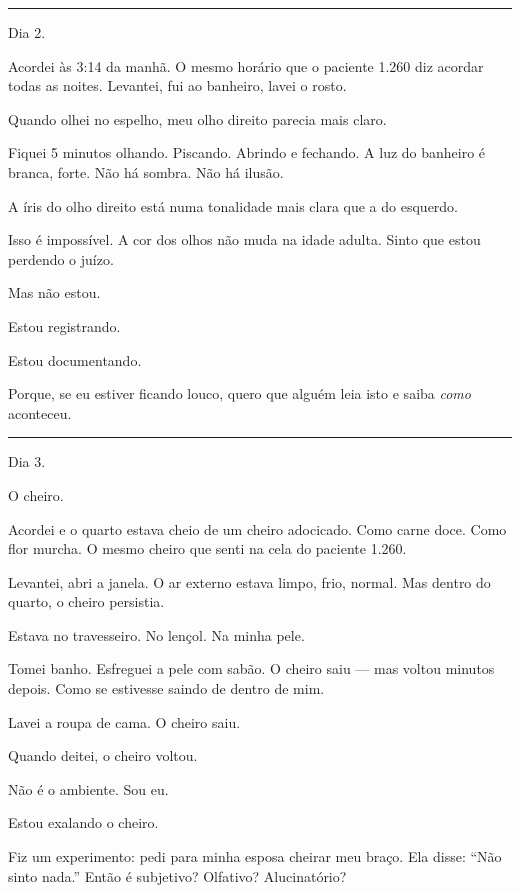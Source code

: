 \vspace{0.5em}\noindent\rule{\textwidth}{0.5pt}\vspace{0.5em}

\noindent Dia 2.

\noindent Acordei às 3:14 da manhã. O mesmo horário que o paciente 1.260 diz acordar todas as noites. Levantei, fui ao banheiro, lavei o rosto.

\noindent Quando olhei no espelho, meu olho direito parecia mais claro.

\noindent Fiquei 5 minutos olhando. Piscando. Abrindo e fechando. A luz do banheiro é branca, forte. Não há sombra. Não há ilusão.

\noindent A íris do olho direito está numa tonalidade mais clara que a do esquerdo.

\noindent Isso é impossível. A cor dos olhos não muda na idade adulta. Sinto que estou perdendo o juízo.

\noindent Mas não estou.

\noindent Estou registrando.

\noindent Estou documentando.

\noindent Porque, se eu estiver ficando louco, quero que alguém leia isto e saiba \textit{como} aconteceu.

\vspace{0.5em}\noindent\rule{\textwidth}{0.5pt}\vspace{0.5em}

\noindent Dia 3.

\noindent O cheiro.

\noindent Acordei e o quarto estava cheio de um cheiro adocicado. Como carne doce. Como flor murcha. O mesmo cheiro que senti na cela do paciente 1.260.

\noindent Levantei, abri a janela. O ar externo estava limpo, frio, normal. Mas dentro do quarto, o cheiro persistia.

\noindent Estava no travesseiro. No lençol. Na minha pele.

\noindent Tomei banho. Esfreguei a pele com sabão. O cheiro saiu --- mas voltou minutos depois. Como se estivesse saindo de dentro de mim.

\noindent Lavei a roupa de cama. O cheiro saiu.

\noindent Quando deitei, o cheiro voltou.

\noindent Não é o ambiente. Sou eu.

\noindent Estou exalando o cheiro.

\noindent Fiz um experimento: pedi para minha esposa cheirar meu braço. Ela disse: \textquotedblleft{}Não sinto nada.\textquotedblright{} Então é subjetivo? Olfativo? Alucinatório?

